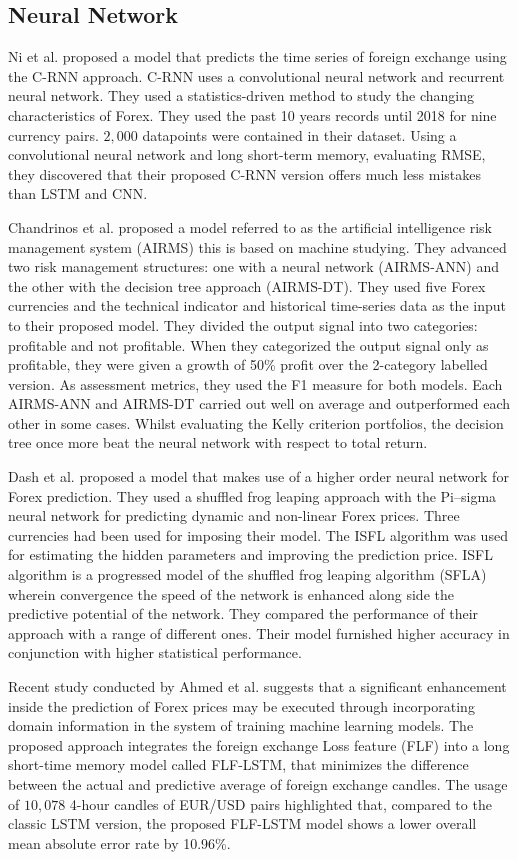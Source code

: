 \subsection{Neural Network}
Ni et al. \cite{Ni19} proposed a model that predicts the time series of foreign exchange using the C-RNN approach. C-RNN uses a convolutional neural network and recurrent neural network. They used a statistics-driven method to study the changing characteristics of Forex. They used the past 10 years records until 2018 for nine currency pairs. $2,000$ datapoints were contained in their dataset. Using a convolutional neural network and long short-term memory, evaluating RMSE, they discovered that their proposed C-RNN version offers much less mistakes than LSTM and CNN.

Chandrinos et al. \cite{Chandrinos18} proposed a model referred to as the artificial intelligence risk management system (AIRMS) this is based on machine studying. They advanced two risk management structures: one with a neural network (AIRMS-ANN) and the other with the decision tree approach (AIRMS-DT). They used five Forex currencies and the technical indicator and historical time-series data as the input to their proposed model. They divided the output signal into two categories: profitable and not profitable. When they categorized the output signal only as profitable, they were given a growth of 50\% profit over the 2-category labelled version. As assessment metrics, they used the F1 measure for both models. Each AIRMS-ANN and AIRMS-DT carried out well on average and outperformed each other in some cases. Whilst evaluating the Kelly criterion portfolios, the decision tree once more beat the neural network with respect to total return.

Dash et al. \cite{Dash18} proposed a model that makes use of a higher order neural network for Forex prediction. They used a shuffled frog leaping approach with the Pi–sigma neural network for predicting dynamic and non-linear Forex prices. Three currencies had been used for imposing their model. The ISFL algorithm was used for estimating the hidden parameters and improving the prediction price. ISFL algorithm is a progressed model of the shuffled frog leaping algorithm (SFLA) wherein convergence the speed of the network is enhanced along side the predictive potential of the network. They compared the performance of their approach with a range of different ones. Their model furnished higher accuracy in conjunction with higher statistical performance.

Recent study conducted by Ahmed et al. \cite{Ahmed20} suggests that a significant enhancement inside the prediction of Forex prices may be executed through incorporating domain information in the system of training machine learning models. The proposed approach integrates the foreign exchange Loss feature (FLF) into a long short-time memory model called FLF-LSTM, that minimizes the difference between the actual and predictive average of foreign exchange candles. The usage of $10,078$ 4-hour candles of EUR/USD pairs highlighted that, compared to the classic LSTM version, the proposed FLF-LSTM model shows a lower overall mean absolute error rate by 10.96\%.

